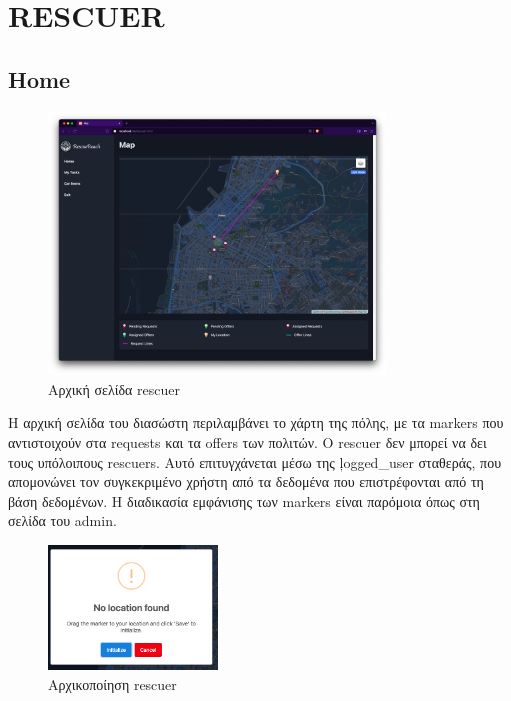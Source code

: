 \section{RESCUER}
    \subsection{Home}
        \begin{figure}[H] \noindent \centering
            \includegraphics[width=0.8\textwidth]{img/rescuer-map}
            \caption{Αρχική σελίδα rescuer}
        \end{figure}

        Η αρχική σελίδα του διασώστη περιλαμβάνει το χάρτη της πόλης, με τα markers που αντιστοιχούν στα requests και τα offers των πολιτών.
        Ο rescuer δεν μπορεί να δει τους υπόλοιπους rescuers.
        Αυτό επιτυγχάνεται μέσω της \c{logged\_user} σταθεράς, που απομονώνει τον συγκεκριμένο χρήστη από τα δεδομένα που επιστρέφονται από τη βάση δεδομένων.
        Η διαδικασία εμφάνισης των markers είναι παρόμοια όπως στη σελίδα του admin.

        \begin{figure}[H] \noindent \centering
            \includegraphics[width=0.4\textwidth]{img/rescuer-no_location}
            \caption{Αρχικοποίηση rescuer}
        \end{figure}

